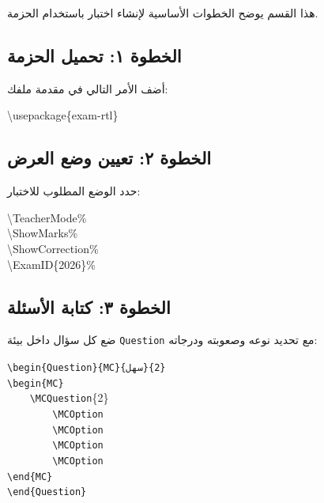 \documentclass[a4paper]{article}
\newcommand{\engtt}[1]{\textenglish{\texttt{#1}}}
\begin{document}
هذا القسم يوضح الخطوات الأساسية لإنشاء اختبار باستخدام الحزمة.

\subsection*{الخطوة ١: تحميل الحزمة}

أضف الأمر التالي في مقدمة ملفك:
\begin{LTR}\ttfamily
\textbackslash usepackage\{exam-rtl\}
\end{LTR}

\subsection*{الخطوة ٢: تعيين وضع العرض}

حدد الوضع المطلوب للاختبار:
\begin{LTR}\ttfamily
\textbackslash TeacherMode\qquad\%\quad{}\\
\textbackslash ShowMarks\qquad\%\quad{}\\
\textbackslash ShowCorrection\qquad\%\quad{}\\
\textbackslash ExamID\{2026\}\qquad\%\quad{}
\end{LTR}

\subsection*{الخطوة ٣: كتابة الأسئلة}

ضع كل سؤال داخل بيئة \engtt{Question} مع تحديد نوعه وصعوبته ودرجاته:
\begin{LTR}\ttfamily
\verb|\begin{Question}{MC}{سهل}{2}|\\
\verb|\begin{MC}|\\
\verb|    \MCQuestion|\{2\}\\
\verb|        \MCOption|\\
\verb|        \MCOption|\\
\verb|        \MCOption|\\
\verb|        \MCOption|\\
\verb|\end{MC}|\\
\verb|\end{Question}|
\end{LTR}
\end{document}

